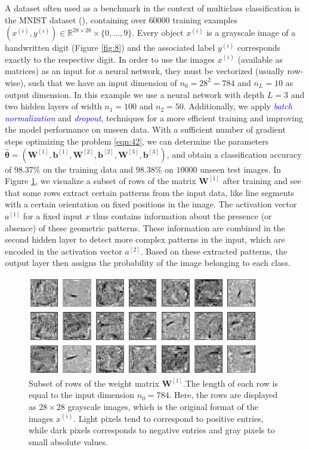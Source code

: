 \begin{example}[MNIST]
A dataset often used as a benchmark in the context of multiclass classification is the MNIST dataset (\cite{lecun1998mnist, lecun1998gradient}), containing over $60000$ training examples $(x^{(i)}, y^{(i)}) \in \mathbb{R}^{28 \times 28} \times \{0, \ldots, 9\}$. Every object $x^{(i)}$ is a grayscale image of a handwritten digit (Figure \ref{fig:8}) and the associated label $y^{(i)}$ corresponds exactly to the respective digit. In order to use the images $x^{(i)}$ (available as matrices) as an input for a neural network, they must be vectorized (usually row-wise), such that we have an input dimension of $n_0 = 28^2 = 784$ and $n_L = 10$ as output dimension. In this example we use a neural network with depth $L=3$ and two hidden layers of width $n_1 = 100$ and $n_2 = 50$. Additionally, we apply \textcolor{blue}{\emph{batch normalization}} and \textcolor{blue}{\emph{dropout}}, techniques for a more efficient training and improving the model performance on unseen data. With a sufficient number of gradient steps optimizing the problem \ref{eqn:42}, we can determine the parameters $\hat{\boldsymbol{\theta}} = (\boldsymbol{W}^{[1]}, \boldsymbol{b}^{[1]}, \boldsymbol{W}^{[2]}, \boldsymbol{b}^{[2]}, \boldsymbol{W}^{[3]}, \boldsymbol{b}^{[3]})$, and obtain a classification accuracy of $98.37\%$ on the training data and $98.38\%$ on $10000$ unseen test images. In Figure \ref{fig:9}, we visualize a subset of rows of the matrix $\boldsymbol{W}^{[1]}$ after training and see that some rows extract certain patterns from the input data, like line segments with a certain orientation on fixed positions in the image. The activation vector $a^{[1]}$ for a fixed input $x$ thus contains information about the presence (or absence) of these geometric patterns. These information are combined in the second hidden layer to detect more complex patterns in the input, which are encoded in the activation vector $a^{[2]}$. Based on these extracted patterns, the output layer then assigns the probability of the image belonging to each class.
\end{example}

\begin{figure}[h!]
    \centering
    \includegraphics[width=0.9\textwidth]{images/figure9.png}
    \caption{
    Subset of rows of the weight matrix $\boldsymbol{W}^{[1]}$.The length of each row is equal to the input dimension $n_0 = 784$. Here, the rows are displayed as $28 \times 28$ grayscale images, which is the original format of the images $x^{(i)}$. Light pixels tend to correspond to positive entries, while dark pixels corresponds to negative entries and gray pixels to small absolute values.
    }
    \label{fig:9}
\end{figure}

